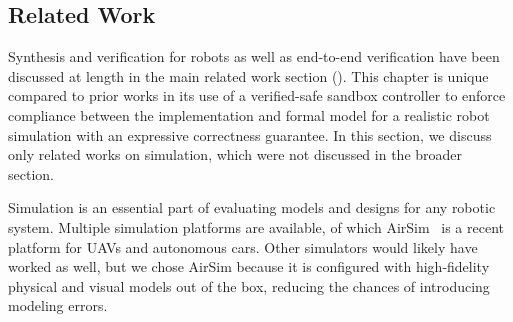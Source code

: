 \documentclass[12pt]{cmuthesis}
\theoremstyle{definition}
\theoremstyle{remark}
\newcommand{\rref}[2][]{\prettyref{#2}}
\newcommand{\VeriPhy}{VeriPhy\xspace}
\begin{document}


\subsection{Related Work}
Synthesis and verification for robots as well as end-to-end verification have been discussed at length in the main related work section (\rref{sec:relwork}).
This chapter is unique compared to prior works in its use of a verified-safe sandbox controller to enforce compliance between the implementation and formal model for a realistic robot simulation with an expressive correctness guarantee.
In this section, we discuss only related works on simulation, which were not discussed in the broader section.

Simulation is an essential part of evaluating models and designs for any robotic system.
Multiple simulation platforms are available, of which AirSim~\cite{shah2018airsim} is a recent platform for UAVs and autonomous cars.
Other simulators would likely have worked as well, but we chose AirSim because it is configured with high-fidelity physical and visual models out of the box, reducing the chances of introducing modeling errors.
\end{document}
